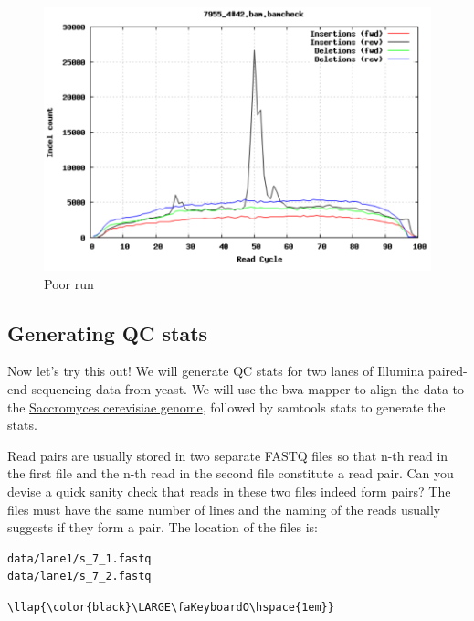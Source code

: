\documentclass[11pt]{article}
\makeatletter
\def\maxwidth{\ifdim\Gin@nat@width>\linewidth\linewidth
    \else\Gin@nat@width\fi}
\let\Oldincludegraphics\includegraphics
\renewcommand{\includegraphics}[1]{\Oldincludegraphics[width=.8\maxwidth, height=.55\textheight, keepaspectratio]{#1}}
\makeatother
\begin{document}
    \begin{figure}[H]
\centering
\includegraphics{img/indels-per-cycle.fail.png}
\caption{Poor run}
\end{figure}

    \hypertarget{generating-qc-stats}{%
\subsection{Generating QC stats}\label{generating-qc-stats}}

Now let's try this out! We will generate QC stats for two lanes of
Illumina paired-end sequencing data from yeast. We will use the bwa
mapper to align the data to the
\href{ftp://ftp.ensembl.org/pub/current_fasta/saccharomyces_cerevisiae/dna}{Saccromyces
cerevisiae genome}, followed by samtools stats to generate the stats.

Read pairs are usually stored in two separate FASTQ files so that n-th
read in the first file and the n-th read in the second file constitute a
read pair. Can you devise a quick sanity check that reads in these two
files indeed form pairs? The files must have the same number of lines
and the naming of the reads usually suggests if they form a pair. The
location of the files is:

\begin{verbatim}
data/lane1/s_7_1.fastq
data/lane1/s_7_2.fastq
\end{verbatim}

\begin{terminalinput}
\begin{Verbatim}[commandchars=\\\{\}]
\llap{\color{black}\LARGE\faKeyboardO\hspace{1em}}
\end{Verbatim}
\end{terminalinput}
\end{document}
